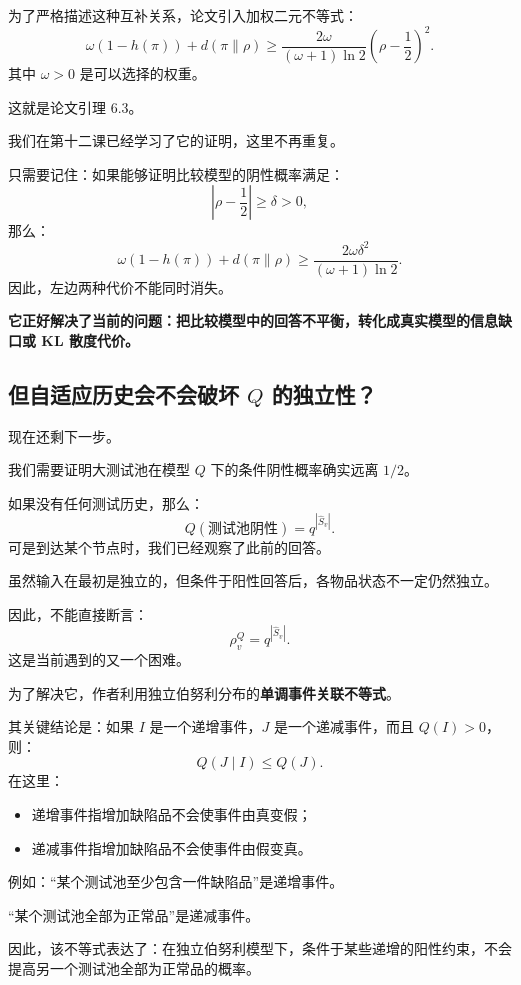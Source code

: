 \documentclass[UTF8,11pt]{ctexart}
\begin{document}
为了严格描述这种互补关系，论文引入加权二元不等式：
\begin{equation}
\boxed{\omega(1-h(\pi))+d(\pi\|\rho)\ge\frac{2\omega}{(\omega+1)\ln2}\left(\rho-\frac12\right)^2.}
\tag{23}
\end{equation}
其中 $\omega>0$ 是可以选择的权重。

这就是论文引理 6.3。

我们在第十二课已经学习了它的证明，这里不再重复。

只需要记住：如果能够证明比较模型的阴性概率满足：
\[\left|\rho-\frac12\right|\ge\delta>0,\]
那么：
\[\omega(1-h(\pi))+d(\pi\|\rho)\ge\frac{2\omega\delta^2}{(\omega+1)\ln2}.\]
因此，左边两种代价不能同时消失。

\textbf{它正好解决了当前的问题：把比较模型中的回答不平衡，转化成真实模型的信息缺口或 KL 散度代价。}

\subsection{但自适应历史会不会破坏 $Q$ 的独立性？}
现在还剩下一步。

我们需要证明大测试池在模型 $Q$ 下的条件阴性概率确实远离 $1/2$。

如果没有任何测试历史，那么：
\[Q(\text{测试池阴性})=q^{|\widehat S_v|}.\]
可是到达某个节点时，我们已经观察了此前的回答。

虽然输入在最初是独立的，但条件于阳性回答后，各物品状态不一定仍然独立。

因此，不能直接断言：
\[\rho_v^Q=q^{|\widehat S_v|}.\]
这是当前遇到的又一个困难。

为了解决它，作者利用独立伯努利分布的\textbf{单调事件关联不等式}。

其关键结论是：如果 $I$ 是一个递增事件，$J$ 是一个递减事件，而且 $Q(I)>0$，则：
\begin{equation}\boxed{Q(J\mid I)\le Q(J).}\tag{24}\end{equation}
在这里：
\begin{itemize}
\item 递增事件指增加缺陷品不会使事件由真变假；
\item 递减事件指增加缺陷品不会使事件由假变真。
\end{itemize}
例如：“某个测试池至少包含一件缺陷品”是递增事件。

“某个测试池全部为正常品”是递减事件。

因此，该不等式表达了：在独立伯努利模型下，条件于某些递增的阳性约束，不会提高另一个测试池全部为正常品的概率。
\end{document}
